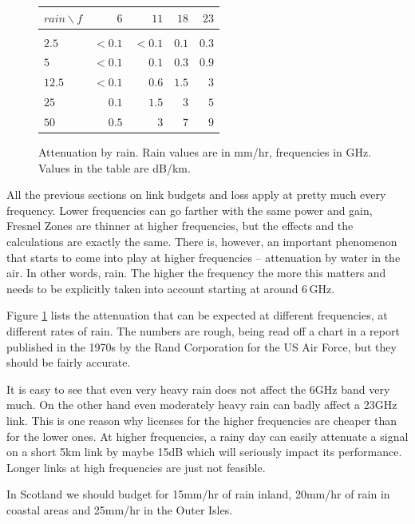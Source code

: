 \begin{figure}[h]
  \begin{center}
    \begin{tabular}{l|rrrr}
      $rain\backslash f$ & $6$ & $11$ & $18$ & $23$ \\
      \hline\\
      $2.5$ & $< 0.1$ & $< 0.1$ & $0.1$ & $0.3$\\
      $5$   & $< 0.1$ & $0.1$ & $0.3$ & $0.9$\\ 
      $12.5$ & $< 0.1$ & $0.6$ & $1.5$ & $3$\\
      $25$ & $0.1$ & $1.5$ & $3$ & $5$\\
      $50$ & $0.5$ & $3$ & $7$ & $9$\\
    \end{tabular}
  \end{center}
  \caption{Attenuation by rain. Rain values are in mm/hr, frequencies
    in GHz. Values in the table are dB/km.}
  \label{fig:rain_fade}
\end{figure}

All the previous sections on link budgets and loss apply at pretty
much every frequency. Lower frequencies can go farther with the same
power and gain, Fresnel Zones are thinner at higher frequencies, but
the effects and the calculations are exactly the same. There is,
however, an important phenomenon that starts to come into play at
higher frequencies -- attenuation by water in the air. In other words,
rain. The higher the frequency the more this matters and needs to be
explicitly taken into account starting at around $6\, \mathrm{GHz}$. 

Figure \ref{fig:rain_fade} lists the attenuation that can be expected
at different frequencies, at different rates of rain.  The numbers are
rough, being read off a chart in a report published in the 1970s by
the Rand Corporation for the US Air Force, but they should be fairly
accurate.

It is easy to see that even very heavy rain does not affect the 6GHz
band very much. On the other hand even moderately heavy rain can badly
affect a 23GHz link. This is one reason why licenses for the higher
frequencies are cheaper than for the lower ones. At higher
frequencies, a rainy day can easily attenuate a signal on a short 5km
link by maybe 15dB which will seriously impact its performance. Longer
links at high frequencies are just not feasible.

In Scotland we should budget for 15mm/hr of rain inland,
20mm/hr of rain in coastal areas and 25mm/hr
in the Outer Isles.


